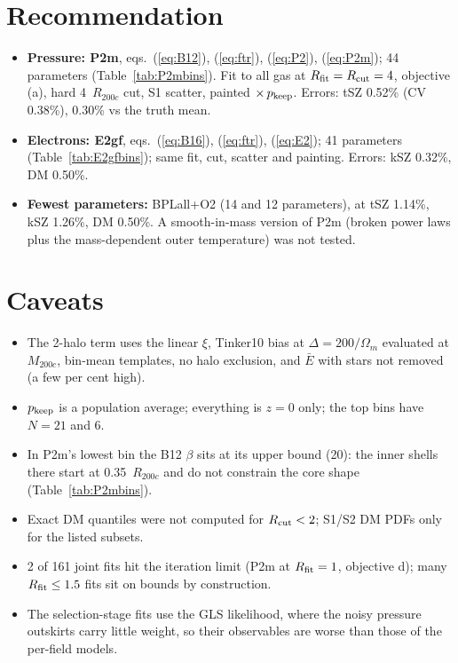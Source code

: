 \documentclass[10pt,a4paper]{article}
\newcommand{\Rc}{R_{200c}}
\newcommand{\Rfit}{R_{\rm fit}}
\newcommand{\Rcut}{R_{\rm cut}}
\newcommand{\pk}{p_{\rm keep}}
\begin{document}
\section{Recommendation}\label{sec:rec}
\begin{itemize}
\item \textbf{Pressure: P2m}, eqs.~(\ref{eq:B12}), (\ref{eq:ftr}), (\ref{eq:P2}), (\ref{eq:P2m}); 44 parameters
  (Table~\ref{tab:P2mbins}). Fit to all gas at $\Rfit=\Rcut=4$, objective (a), hard 4~$\Rc$ cut, S1 scatter, painted
  $\times\,\pk$. Errors: tSZ 0.52\% (CV 0.38\%), 0.30\% vs the truth mean.
\item \textbf{Electrons: E2gf}, eqs.~(\ref{eq:B16}), (\ref{eq:ftr}), (\ref{eq:E2}); 41 parameters (Table~\ref{tab:E2gfbins});
  same fit, cut, scatter and painting. Errors: kSZ 0.32\%, DM 0.50\%.
\item \textbf{Fewest parameters:} BPLall+O2 (14 and 12 parameters), at tSZ 1.14\%, kSZ 1.26\%, DM 0.50\%. A smooth-in-mass
  version of P2m (broken power laws plus the mass-dependent outer temperature) was not tested.
\end{itemize}

\section{Caveats}
\begin{itemize}
\item The 2-halo term uses the linear $\xi$, Tinker10 bias at $\Delta=200/\Omega_m$ evaluated at $M_{200c}$, bin-mean
  templates, no halo exclusion, and $\bar E$ with stars not removed (a few per cent high).
\item $\pk$ is a population average; everything is $z=0$ only; the top bins have $N=21$ and 6.
\item In P2m's lowest bin the B12 $\beta$ sits at its upper bound (20): the inner shells there start at 0.35~$\Rc$ and do
  not constrain the core shape (Table~\ref{tab:P2mbins}).
\item Exact DM quantiles were not computed for $\Rcut<2$; S1/S2 DM PDFs only for the listed subsets.
\item 2 of 161 joint fits hit the iteration limit (P2m at $\Rfit=1$, objective d); many $\Rfit\le1.5$ fits sit on bounds by
  construction.
\item The selection-stage fits use the GLS likelihood, where the noisy pressure outskirts carry little weight, so their
  observables are worse than those of the per-field models.
\end{itemize}
\end{document}
